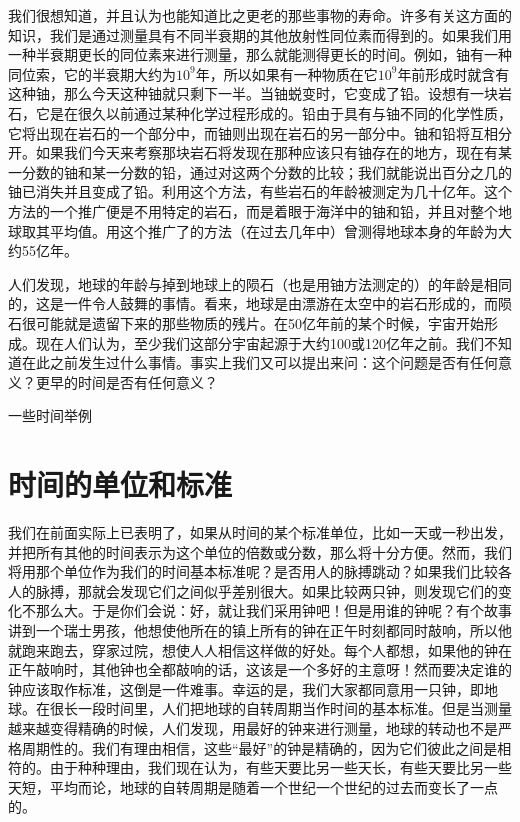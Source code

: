 \documentclass[12pt,oneside]{book}
\begin{document}
我们很想知道，并且认为也能知道比之更老的那些事物的寿命。许多有关这方面的知识，我们是通过测量具有不同半衰期的其他放射性同位素而得到的。如果我们用一种半衰期更长的同位素来进行测量，那么就能测得更长的时间。例如，铀有一种同位索，它的半衰期大约为$ 10^9 $年，所以如果有一种物质在它$ 10^9 $年前形成时就含有这种铀，那么今天这种铀就只剩下一半。当铀蜕变时，它变成了铅。设想有一块岩石，它是在很久以前通过某种化学过程形成的。铅由于具有与铀不同的化学性质，它将出现在岩石的一个部分中，而铀则出现在岩石的另一部分中。铀和铅将互相分开。如果我们今天来考察那块岩石将发现在那种应该只有铀存在的地方，现在有某一分数的铀和某一分数的铅，通过对这两个分数的比较；我们就能说出百分之几的铀已消失并且变成了铅。利用这个方法，有些岩石的年龄被测定为几十亿年。这个方法的一个推广便是不用特定的岩石，而是着眼于海洋中的铀和铅，并且对整个地球取其平均值。用这个推广了的方法（在过去几年中）曾测得地球本身的年龄为大约55亿年。

人们发现，地球的年龄与掉到地球上的陨石（也是用铀方法测定的）的年龄是相同的，这是一件令人鼓舞的事情。看来，地球是由漂游在太空中的岩石形成的，而陨石很可能就是遗留下来的那些物质的残片。在50亿年前的某个时候，宇宙开始形成。现在人们认为，至少我们这部分宇宙起源于大约100或120亿年之前。我们不知道在此之前发生过什么事情。事实上我们又可以提出来问：这个问题是否有任何意义？更早的时间是否有任何意义？

\begin{fig}{一些时间举例}
\caption{一些时间举例}
\label{fig:一些时间举例}
\end{fig}


\section{时间的单位和标准}
我们在前面实际上已表明了，如果从时间的某个标准单位，比如一天或一秒出发，并把所有其他的时间表示为这个单位的倍数或分数，那么将十分方便。然而，我们将用那个单位作为我们的时间基本标准呢？是否用人的脉搏跳动？如果我们比较各人的脉搏，那就会发现它们之间似乎差别很大。如果比较两只钟，则发现它们的变化不那么大。于是你们会说：好，就让我们采用钟吧！但是用谁的钟呢？有个故事讲到一个瑞士男孩，他想使他所在的镇上所有的钟在正午时刻都同时敲响，所以他就跑来跑去，穿家过院，想使人人相信这样做的好处。每个人都想，如果他的钟在正午敲响时，其他钟也全都敲响的话，这该是一个多好的主意呀！然而要决定谁的钟应该取作标准，这倒是一件难事。幸运的是，我们大家都同意用一只钟，即地球。在很长一段时间里，人们把地球的自转周期当作时间的基本标准。但是当测量越来越变得精确的时候，人们发现，用最好的钟来进行测量，地球的转动也不是严格周期性的。我们有理由相信，这些“最好”的钟是精确的，因为它们彼此之间是相符的。由于种种理由，我们现在认为，有些天要比另一些天长，有些天要比另一些天短，平均而论，地球的自转周期是随着一个世纪一个世纪的过去而变长了一点的。
\end{document}
